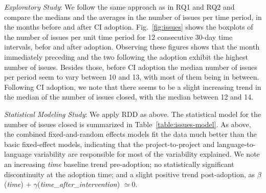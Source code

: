 \smallskip\noindent \emph{Exploratory Study}:
We follow the same approach as in RQ1 and RQ2 and compare the 
medians and the averages in the number of issues per time period, in the 
months before and after CI adoption.
Fig.~\ref{fig:issues} shows the boxplots of the number of 
issues per unit time period for 12 consecutive 30-day time intervals, befor and after \Tvis adoption.
Observing these figures shows that the month immediately preceding 
and the two following the adoption exhibit the highest number of issues.
Besides those, before CI adoption the median number of issues per period seem to vary between 10 and 13, with most of them being in between.
Following CI adoption, we note that there seems to be a slight increasing trend in the median of the number of issues closed, with the median between 12 and 14.

%

\smallskip\noindent \emph{Statistical Modeling Study}:
We apply RDD as above. 
The statistical model for the number of issues closed is summarized in Table~\ref{table:issues-model}.
As above, the combined fixed-and-random effects models fit the data much 
better than the basic fixed-effect models, indicating that the project-to-project 
and language-to-language variability are responsible for most of the variability 
explained.
We note an increasing
\emph{time} baseline trend pre-adoption; no statistically significant discontinuity
at the adoption time; and a slight positive trend post-adoption, as $\beta$(\emph{time}) $+$ 
$\gamma$(\emph{time\_after\_intervention}) $\simeq 0$.




